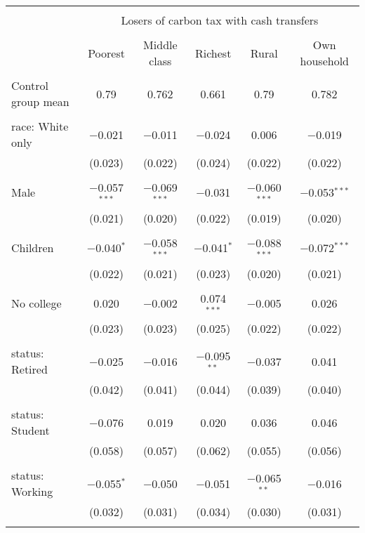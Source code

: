 
\begin{tabular}{@{\extracolsep{5pt}}lccccc} 
\\[-1.8ex]\hline 
\hline \\[-1.8ex] 
 & \multicolumn{5}{c}{Losers of carbon tax with cash transfers} \\ 
\cline{2-6} 
\\[-1.8ex] & Poorest & Middle class & Richest & Rural & Own household \\ 
\hline \\[-1.8ex] 
 Control group mean & 0.79 & 0.762 & 0.661 & 0.79 & 0.782  \\ \hline \\[-1.8ex] race: White only & $-$0.021 & $-$0.011 & $-$0.024 & 0.006 & $-$0.019 \\ 
  & (0.023) & (0.022) & (0.024) & (0.022) & (0.022) \\ 
  & & & & & \\ 
 Male & $-$0.057$^{***}$ & $-$0.069$^{***}$ & $-$0.031 & $-$0.060$^{***}$ & $-$0.053$^{***}$ \\ 
  & (0.021) & (0.020) & (0.022) & (0.019) & (0.020) \\ 
  & & & & & \\ 
 Children & $-$0.040$^{*}$ & $-$0.058$^{***}$ & $-$0.041$^{*}$ & $-$0.088$^{***}$ & $-$0.072$^{***}$ \\ 
  & (0.022) & (0.021) & (0.023) & (0.020) & (0.021) \\ 
  & & & & & \\ 
 No college & 0.020 & $-$0.002 & 0.074$^{***}$ & $-$0.005 & 0.026 \\ 
  & (0.023) & (0.023) & (0.025) & (0.022) & (0.022) \\ 
  & & & & & \\ 
 status: Retired & $-$0.025 & $-$0.016 & $-$0.095$^{**}$ & $-$0.037 & 0.041 \\ 
  & (0.042) & (0.041) & (0.044) & (0.039) & (0.040) \\ 
  & & & & & \\ 
 status: Student & $-$0.076 & 0.019 & 0.020 & 0.036 & 0.046 \\ 
  & (0.058) & (0.057) & (0.062) & (0.055) & (0.056) \\ 
  & & & & & \\ 
 status: Working & $-$0.055$^{*}$ & $-$0.050 & $-$0.051 & $-$0.065$^{**}$ & $-$0.016 \\ 
  & (0.032) & (0.031) & (0.034) & (0.030) & (0.031) \\ 
  & & & & & \\ 

\end{tabular}
